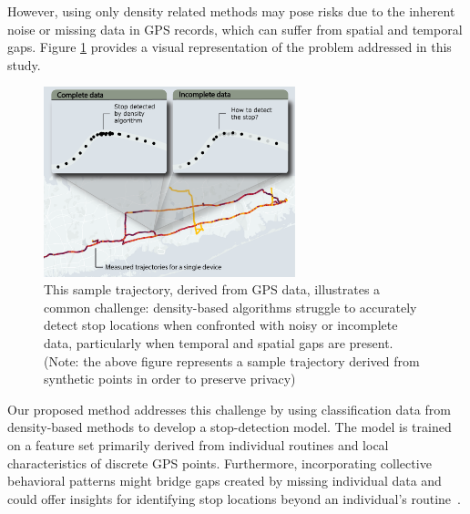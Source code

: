 \documentclass{article}
\begin{document}
However, using only density related methods may pose risks due to the inherent noise or missing data in GPS records, which can suffer from spatial and temporal gaps. Figure \ref{fig:fig_problem_setup} provides a visual representation of the problem addressed in this study.

\begin{figure}[ht]
    \includegraphics[width=0.65\textwidth]{./Images/Figure_problem_explaination.png}
	\centering
	\caption{This sample trajectory, derived from GPS data, illustrates a common challenge: density-based algorithms struggle to accurately detect stop locations when confronted with noisy or incomplete data, particularly when temporal and spatial gaps are present. (Note: the above figure represents a sample trajectory derived from synthetic points in order to preserve privacy) 
 }
	\label{fig:fig_problem_setup}
\end{figure}

Our proposed method addresses this challenge by using classification data from density-based methods to develop a stop-detection model. The model is trained on a feature set primarily derived from individual routines and local characteristics of discrete GPS points. Furthermore, incorporating collective behavioral patterns might bridge gaps created by missing individual data and could offer insights for identifying stop locations beyond an individual's routine~\citep{Bontorin2024a}.


\end{document}

